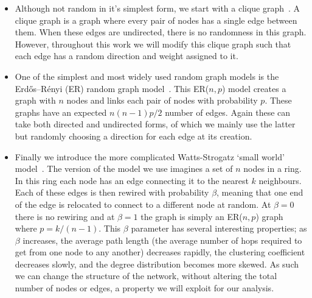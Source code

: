 \begin{itemize}
	\item Although not random in it's simplest form, we start with a clique graph~\cite{newman_networks_2018}. A clique graph is a graph where every pair of nodes has a single edge between them. When these edges are undirected, there is no randomness in this graph. However, throughout this work we will modify this clique graph such that each edge has a random direction and weight assigned to it. 
	\item One of the simplest and most widely used random graph models is the Erdős–Rényi (ER) random graph model~\cite{erdos_evolution_1960,gilbert_random_1959}. This ER($n,p$) model creates a graph with $n$ nodes and links each pair of nodes with probability $p$. These graphs have an expected $n(n-1)p/2$ number of edges. Again these can take both directed and undirected forms, of which we mainly use the latter but randomly choosing a direction for each edge at its creation.
	\item Finally we introduce the more complicated Watts-Strogatz `small world' model~\cite{watts_collective_1998-1}. The version of the model we use imagines a set of $n$ nodes in a ring. In this ring each node has an edge connecting it to the nearest $k$ neighbours. Each of these edges is then rewired with probability $\beta$, meaning that one end of the edge is relocated to connect to a different node at random. At $\beta=0$ there is no rewiring and at $\beta=1$ the graph is simply an ER($n,p$) graph where $p = k/(n-1)$. This $\beta$ parameter has several interesting properties; as $\beta$ increases, the average path length (the average number of hops required to get from one node to any another) decreases rapidly, the clustering coefficient decreases slowly, and the degree distribution becomes more skewed. As such we can change the structure of the network, without altering the total number of nodes or edges, a property we will exploit for our analysis.
\end{itemize}

